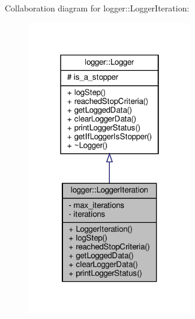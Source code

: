 Collaboration diagram for logger\+:\+:Logger\+Iteration\+:
\nopagebreak
\begin{figure}[H]
\begin{center}
\leavevmode
\includegraphics[width=202pt]{classlogger_1_1_logger_iteration__coll__graph}
\end{center}
\end{figure}
